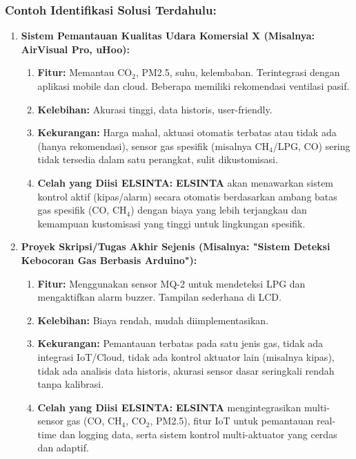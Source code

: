 \documentclass{elsinta}
\begin{document}
\subsubsection*{Contoh Identifikasi Solusi Terdahulu:}
\begin{enumerate}
 
    \item \textbf{Sistem Pemantauan Kualitas Udara Komersial X (Misalnya: AirVisual Pro, uHoo):}
    \begin{enumerate}
        \item \textbf{Fitur:} Memantau CO$_2$, PM2.5, suhu, kelembaban. Terintegrasi dengan aplikasi mobile dan cloud. Beberapa memiliki rekomendasi ventilasi pasif.
        \item \textbf{Kelebihan:} Akurasi tinggi, data historis, user-friendly.
        \item \textbf{Kekurangan:} Harga mahal, aktuasi otomatis terbatas atau tidak ada (hanya rekomendasi), sensor gas spesifik (misalnya CH$_4$/LPG, CO) sering tidak tersedia dalam satu perangkat, sulit dikustomisasi.
        \item \textbf{Celah yang Diisi  ELSINTA:} \textbf{ ELSINTA} akan menawarkan sistem kontrol aktif (kipas/alarm) secara otomatis berdasarkan ambang batas gas spesifik (CO, CH$_4$) dengan biaya yang lebih terjangkau dan kemampuan kustomisasi yang tinggi untuk lingkungan spesifik.
    \end{enumerate}
    \item \textbf{Proyek Skripsi/Tugas Akhir Sejenis (Misalnya: "Sistem Deteksi Kebocoran Gas Berbasis Arduino"):}
    \begin{enumerate}
        \item \textbf{Fitur:} Menggunakan sensor MQ-2 untuk mendeteksi LPG dan mengaktifkan alarm buzzer. Tampilan sederhana di LCD.
        \item \textbf{Kelebihan:} Biaya rendah, mudah diimplementasikan.
        \item \textbf{Kekurangan:} Pemantauan terbatas pada satu jenis gas, tidak ada integrasi IoT/Cloud, tidak ada kontrol aktuator lain (misalnya kipas), tidak ada analisis data historis, akurasi sensor dasar seringkali rendah tanpa kalibrasi.
        \item \textbf{Celah yang Diisi  ELSINTA:} \textbf{ ELSINTA} mengintegrasikan multi-sensor gas (CO, CH$_4$, CO$_2$, PM2.5), fitur IoT untuk pemantauan real-time dan logging data, serta sistem kontrol multi-aktuator yang cerdas dan adaptif.
    \end{enumerate}
\end{enumerate}
\end{document}
